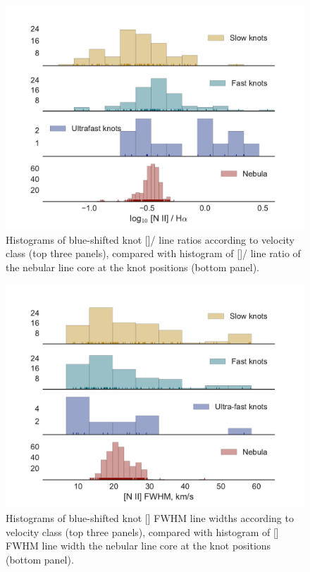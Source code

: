 \documentclass[usenatbib]{mnras}
\begin{document}
\begin{figure}
  \centering
  \includegraphics[width=\linewidth]{knot-histogram-ratio}
  \caption{Histograms of blue-shifted knot [\nii]/\ha{} line ratios
    according to velocity class (top three panels), compared with
    histogram of [\nii]/\ha{} line ratio of the nebular line core at
    the knot positions (bottom panel).}
  \label{fig:histogram-ratios}
\end{figure}

\begin{figure}
  \centering
  \includegraphics[width=\linewidth]{knot-histogram-fwhm}
  \caption{Histograms of blue-shifted knot [\nii] FWHM line widths
    according to velocity class (top three panels), compared with
    histogram of [\nii] FWHM line width the nebular line core at
    the knot positions (bottom panel).}
  \label{fig:histogram-widths}
\end{figure}
\end{document}
